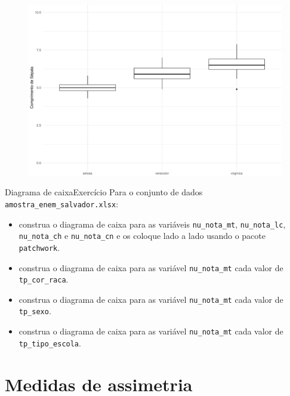 \documentclass[
  10pt,
  ignorenonframetext,
]{beamer}
\providecommand{\tightlist}{%
  \setlength{\itemsep}{0pt}\setlength{\parskip}{0pt}}\usepackage{longtable,booktabs,array}
\begin{document}
\begin{frame}
\begin{figure}

{\centering \includegraphics[width=1\textwidth,height=\textheight]{exploracao-visualizacao_files/figure-beamer/unnamed-chunk-99-1.pdf}

}

\end{figure}
\end{frame}

\begin{frame}[fragile]{Diagrama de caixa\newline Exercício}
\protect\hypertarget{diagrama-de-caixaexercuxedcio}{}
Para o conjunto de dados \texttt{amostra\_enem\_salvador.xlsx}:

\begin{itemize}
\tightlist
\item
  construa o diagrama de caixa para as variáveis \texttt{nu\_nota\_mt},
  \texttt{nu\_nota\_lc}, \texttt{nu\_nota\_ch} e \texttt{nu\_nota\_cn} e
  os coloque lado a lado usando o pacote \texttt{patchwork}.
\item
  construa o diagrama de caixa para as variável \texttt{nu\_nota\_mt}
  cada valor de \texttt{tp\_cor\_raca}.
\item
  construa o diagrama de caixa para as variável \texttt{nu\_nota\_mt}
  cada valor de \texttt{tp\_sexo}.
\item
  construa o diagrama de caixa para as variável \texttt{nu\_nota\_mt}
  cada valor de \texttt{tp\_tipo\_escola}.
\end{itemize}
\end{frame}

\hypertarget{medidas-de-assimetria}{%
\section{Medidas de assimetria}\label{medidas-de-assimetria}}
\end{document}
